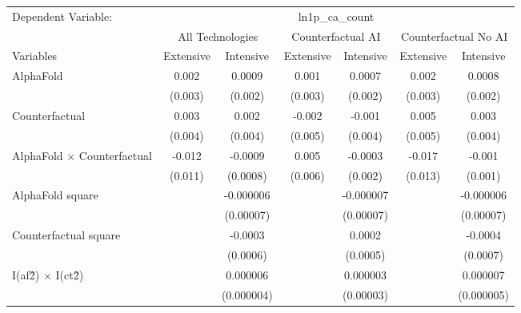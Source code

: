 \begingroup
\centering
\begin{tabular}{lcccccc}
   \tabularnewline \midrule \midrule
   Dependent Variable: & \multicolumn{6}{c}{ln1p\_ca\_count}\\
 & \multicolumn{2}{c}{All Technologies} & \multicolumn{2}{c}{Counterfactual AI} & \multicolumn{2}{c}{Counterfactual No AI} \\
\cmidrule(lr){1-1}\cmidrule(lr){2-3} \cmidrule(lr){4-5} \cmidrule(lr){6-7}
Variables & \multicolumn{1}{c}{Extensive} & \multicolumn{1}{c}{Intensive} & \multicolumn{1}{c}{Extensive} & \multicolumn{1}{c}{Intensive} & \multicolumn{1}{c}{Extensive} & \multicolumn{1}{c}{Intensive} \\
\cmidrule(lr){1-1}\cmidrule(lr){2-2} \cmidrule(lr){3-3} \cmidrule(lr){4-4} \cmidrule(lr){5-5} \cmidrule(lr){6-6} \cmidrule(lr){7-7}
   AlphaFold                          & 0.002   & 0.0009     & 0.001   & 0.0007    & 0.002   & 0.0008\\   
                                      & (0.003) & (0.002)    & (0.003) & (0.002)   & (0.003) & (0.002)\\   
   Counterfactual                     & 0.003   & 0.002      & -0.002  & -0.001    & 0.005   & 0.003\\   
                                      & (0.004) & (0.004)    & (0.005) & (0.004)   & (0.005) & (0.004)\\   
   AlphaFold $\times$ Counterfactual  & -0.012  & -0.0009    & 0.005   & -0.0003   & -0.017  & -0.001\\   
                                      & (0.011) & (0.0008)   & (0.006) & (0.002)   & (0.013) & (0.001)\\   
   AlphaFold square                   &         & -0.000006  &         & -0.000007 &         & -0.000006\\   
                                      &         & (0.00007)  &         & (0.00007) &         & (0.00007)\\   
   Counterfactual square              &         & -0.0003    &         & 0.0002    &         & -0.0004\\   
                                      &         & (0.0006)   &         & (0.0005)  &         & (0.0007)\\   
   I(af\^2) $\times$ I(ct\^2)         &         & 0.000006   &         & 0.000003  &         & 0.000007\\   
                                      &         & (0.000004) &         & (0.00003) &         & (0.000005)\\   

\end{tabular}
